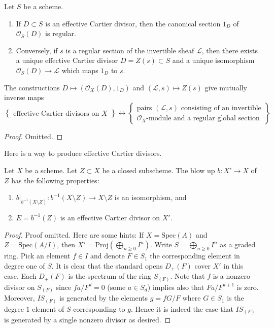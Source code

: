 \begin{lemma}
\label{lemma-characterize-OD}
Let $S$ be a scheme.
\begin{enumerate}
\item If $D \subset S$ is an effective Cartier divisor, then
the canonical section $1_D$ of $\mathcal{O}_S(D)$ is regular.
\item Conversely, if $s$ is a regular section of the invertible
sheaf $\mathcal{L}$, then there exists a unique effective
Cartier divisor $D = Z(s) \subset S$ and a unique isomorphism
$\mathcal{O}_S(D) \to \mathcal{L}$ which maps $1_D$ to $s$.
\end{enumerate}
The constructions
$D \mapsto (\mathcal{O}_X(D), 1_D)$ and $(\mathcal{L}, s) \mapsto Z(s)$
give mutually inverse maps
$$
\left\{
\begin{matrix}
\text{effective Cartier divisors on }X
\end{matrix}
\right\}
\leftrightarrow
\left\{
\begin{matrix}
\text{pairs }(\mathcal{L}, s)\text{ consisting of an invertible}\\
\mathcal{O}_X\text{-module and a regular global section}
\end{matrix}
\right\}
$$
\end{lemma}

\begin{proof}
Omitted.
\end{proof}

\noindent
Here is a way to produce effective Cartier divisors.

\begin{lemma}
\label{lemma-blowing-up-gives-effective-Cartier-divisor}
Let $X$ be a scheme.
Let $Z \subset X$ be a closed subscheme.
The blow up $b : X' \to X$ of $Z$
has the following properties:
\begin{enumerate}
\item $b|_{b^{-1}(X \setminus Z)} : b^{-1}(X \setminus Z) \to X \setminus Z$
is an isomorphism, and
\item $E = b^{-1}(Z)$ is an effective Cartier divisor on $X'$.
\end{enumerate}
\end{lemma}

\begin{proof}
Proof omitted. Here are some hints:
If $X = \text{Spec}(A)$ and $Z = \text{Spec}(A/I)$,
then $X' = \text{Proj}(\bigoplus_{n \geq 0} I^n)$.
Write $S = \bigoplus_{n \geq 0} I^n$ as a graded ring.
Pick an element $f \in I$ and denote $F \in S_1$ the
corresponding element in degree one of $S$. It is clear that
the standard opens $D_{+}(F)$ cover $X'$ in this case.
Each $D_{+}(F)$ is the spectrum of the ring $S_{(F)}$.
Note that $f$ is a nonzero divisor on $S_{(F)}$ since
$f a/F^d = 0$ (some $a \in S_d$)
implies also that $F a/F^{d + 1}$ is zero. Moreover,
$IS_{(F)}$ is generated by the elements
$g = fG/F$ where $G \in S_1$ is the degree $1$ element
of $S$ corresponding to $g$. Hence it is indeed the
case that $IS_{(F)}$ is generated by a single nonzero divisor as desired.
\end{proof}





